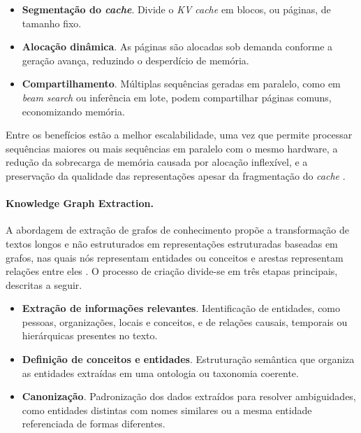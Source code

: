 \begin{itemize}[leftmargin=1.6em]
\item \textbf{Segmentação do \textit{cache}}. Divide o \textit{KV cache} em blocos, ou páginas, de tamanho fixo.

\item \textbf{Alocação dinâmica}. As páginas são alocadas sob demanda conforme a geração avança, reduzindo o desperdício de memória.

\item \textbf{Compartilhamento}. Múltiplas sequências geradas em paralelo, como em \textit{beam search} ou inferência em lote, podem compartilhar páginas comuns, economizando memória.
\end{itemize}

Entre os benefícios estão a melhor escalabilidade, uma vez que permite processar sequências maiores ou mais sequências em paralelo com o mesmo hardware, a redução da sobrecarga de memória causada por alocação inflexível, e a preservação da qualidade das representações apesar da fragmentação do \textit{cache} \cite{kwon2023pagedattention}.

\paragraph{Knowledge Graph Extraction.}
A abordagem de extração de grafos de conhecimento propõe a transformação de textos longos e não estruturados em representações estruturadas baseadas em grafos, nas quais nós representam entidades ou conceitos e arestas representam relações entre eles \cite{alonso2024mixturepageranks}. O processo de criação divide-se em três etapas principais, descritas a seguir.

\begin{itemize}[leftmargin=1.6em]
\item \textbf{Extração de informações relevantes}. Identificação de entidades, como pessoas, organizações, locais e conceitos, e de relações causais, temporais ou hierárquicas presentes no texto.

\item \textbf{Definição de conceitos e entidades}. Estruturação semântica que organiza as entidades extraídas em uma ontologia ou taxonomia coerente.

\item \textbf{Canonização}. Padronização dos dados extraídos para resolver ambiguidades, como entidades distintas com nomes similares ou a mesma entidade referenciada de formas diferentes.
\end{itemize}

